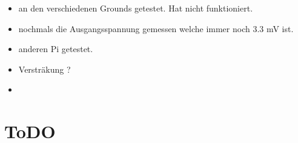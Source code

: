 \documentclass{article}
\begin{document}
\begin{itemize}

\item an den verschiedenen Grounds getestet. Hat nicht funktioniert.

\item nochmals die Ausgangsspannung gemessen welche immer noch 3.3 mV ist.

\item anderen Pi getestet. 

\item Versträkung ?

\item 

\end{itemize}

\section{ToDO}
\end{document}
